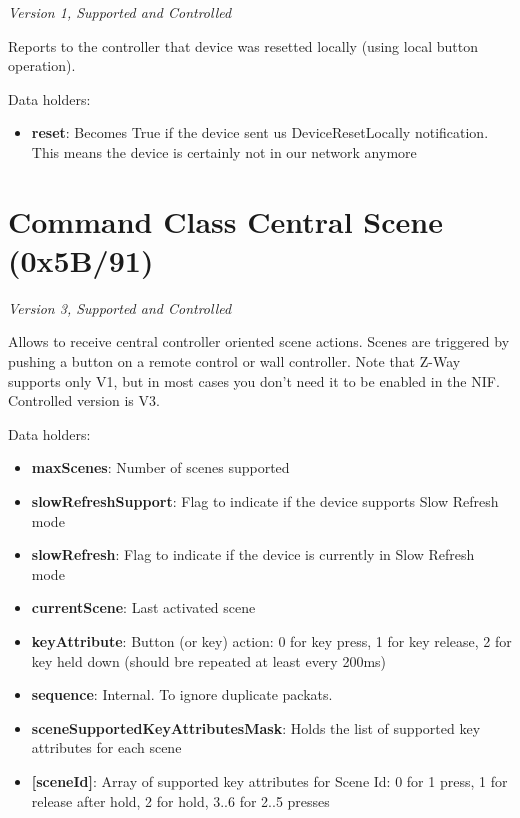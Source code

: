 \textit{Version 1, Supported and Controlled}
\newline

Reports to the controller that device was resetted locally (using local button operation).
\newline

\noindent
Data holders:

\begin{itemize}
\item \textbf{reset}: Becomes True if the device sent us DeviceResetLocally notification. This means the device is certainly not in our network anymore
\end{itemize}


\section{Command Class Central Scene (0x5B/91)}

\textit{Version 3, Supported and Controlled}
\newline

Allows to receive central controller oriented scene actions. Scenes are triggered by pushing a button on a remote control or wall controller. Note that Z-Way supports only V1, but in most cases you don't need it to be enabled in the NIF. Controlled version is V3.
\newline

\noindent
Data holders:

\begin{itemize}
\item \textbf{maxScenes}: Number of scenes supported
\item \textbf{slowRefreshSupport}: Flag to indicate if the device supports Slow Refresh mode
\item \textbf{slowRefresh}: Flag to indicate if the device is currently in Slow Refresh mode
\item \textbf{currentScene}: Last activated scene
\item \textbf{keyAttribute}: Button (or key) action: 0 for key press, 1 for key release, 2 for key held down (should bre repeated at least every 200ms)
\item \textbf{sequence}: Internal. To ignore duplicate packats.
\item \textbf{sceneSupportedKeyAttributesMask}: Holds the list of supported key attributes for each scene
\item \qquad\textbf{[sceneId]}: Array of supported key attributes for Scene Id: 0 for 1 press, 1 for release after hold, 2 for hold, 3..6 for 2..5 presses
\end{itemize}
